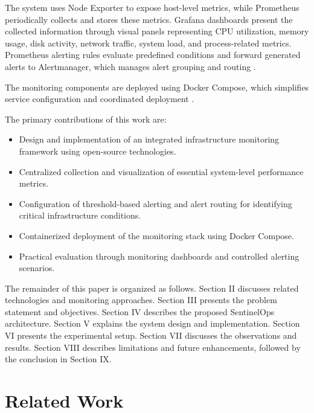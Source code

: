 \documentclass[conference]{IEEEtran}
\begin{document}
The system uses Node Exporter to expose host-level metrics, while
Prometheus periodically collects and stores these metrics. Grafana
dashboards present the collected information through visual panels
representing CPU utilization, memory usage, disk activity, network
traffic, system load, and process-related metrics. Prometheus
alerting rules evaluate predefined conditions and forward generated
alerts to Alertmanager, which manages alert grouping and routing
\cite{alerting,alertmanager}.

The monitoring components are deployed using Docker Compose,
which simplifies service configuration and coordinated deployment
\cite{dockercompose}.

The primary contributions of this work are:

\begin{itemize}
    \item Design and implementation of an integrated infrastructure
    monitoring framework using open-source technologies.

    \item Centralized collection and visualization of essential
    system-level performance metrics.

    \item Configuration of threshold-based alerting and alert
    routing for identifying critical infrastructure conditions.

    \item Containerized deployment of the monitoring stack using
    Docker Compose.

    \item Practical evaluation through monitoring dashboards and
    controlled alerting scenarios.
\end{itemize}

The remainder of this paper is organized as follows.
Section II discusses related technologies and monitoring
approaches. Section III presents the problem statement and
objectives. Section IV describes the proposed SentinelOps
architecture. Section V explains the system design and
implementation. Section VI presents the experimental setup.
Section VII discusses the observations and results. Section VIII
describes limitations and future enhancements, followed by
the conclusion in Section IX.


\section{Related Work}
\end{document}
